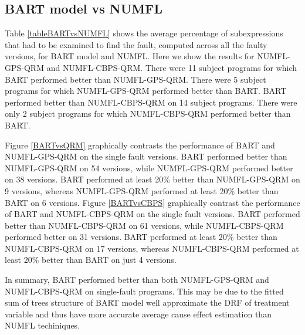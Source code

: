 \subsection{BART model vs NUMFL}
Table \ref{tableBARTvsNUMFL} shows the average percentage of subexpressions that had to be examined to find the fault, computed across all the faulty versions, for BART model and NUMFL.  Here we show the results for NUMFL-GPS-QRM and NUMFL-CBPS-QRM.   There were 11 subject programs for which BART performed better than NUMFL-GPS-QRM. There were 5 subject programs for which NUMFL-GPS-QRM performed better than BART. BART performed better than NUMFL-CBPS-QRM on 14 subject programs. There were only 2 subject programs for which NUMFL-CBPS-QRM performed better than BART.

Figure \ref{BARTvsQRM} graphically contrasts the performance of BART and NUMFL-GPS-QRM on the single fault versions.  BART performed better than NUMFL-GPS-QRM on 54 versions, while NUMFL-GPS-QRM performed better on 38 versions.  BART performed at least 20\% better than NUMFL-GPS-QRM on 9 versions, whereas NUMFL-GPS-QRM performed at least 20\% better than BART on 6 versions. Figure \ref{BARTvsCBPS} graphically contrast the performance of BART and NUMFL-CBPS-QRM on the single fault versions.  BART performed better than NUMFL-CBPS-QRM on 61 versions, while NUMFL-CBPS-QRM performed better on 31 versions.  BART performed at least 20\% better than NUMFL-CBPS-QRM on 17 versions, whereas NUMFL-CBPS-QRM performed at least 20\% better than BART on just 4 versions.

In summary, BART  performed better than both NUMFL-GPS-QRM and NUMFL-CBPS-QRM on single-fault programs. This may be due to the fitted sum of trees structure of BART model well approximate the DRF of treatment variable and thus have more accurate average cause effect estimation than NUMFL techiniques.

